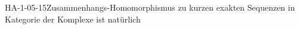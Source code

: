 
\begin{THEO}{HA-1-05-15}{Zusammenhangs-Homomorphismus zu kurzen exakten Sequenzen in Kategorie der Komplexe ist natürlich}
\end{THEO}
